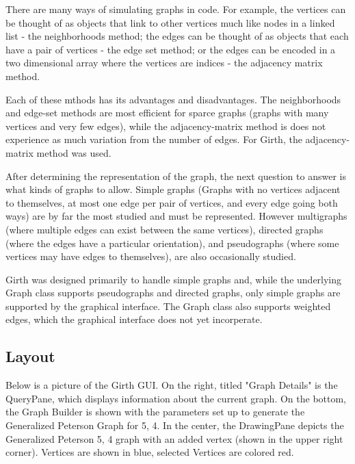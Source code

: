 \documentclass{article}
\begin{document}
There are many ways of simulating graphs in code.
For example,
the vertices can be thought of as objects that link to other vertices much like nodes in a linked list - the neighborhoods method;
the edges can be thought of as objects that each have a pair of vertices - the edge set method;
or the edges can be encoded in a two dimensional array where the vertices are indices - the adjacency matrix method.

Each of these mthods has its advantages and disadvantages.
The neighborhoods and edge-set methods are most efficient for sparce graphs (graphs with many vertices and very few edges),
while the adjacency-matrix method is does not experience as much variation from the number of edges.
For Girth, the adjacency-matrix method was used.

After determining the representation of the graph, the next question to answer is what kinds of graphs to allow.
Simple graphs (Graphs with no vertices adjacent to themselves, at most one edge per pair of vertices, and every edge going both ways)
are by far the most studied and must be represented.
However multigraphs (where multiple edges can exist between the same vertices),
directed graphs (where the edges have a particular orientation),
and pseudographs (where some vertices may have edges to themselves),
are also occasionally studied.

Girth was designed primarily to handle simple graphs and,
while the underlying Graph class supports pseudographs and directed graphs,
only simple graphs are supported by the graphical interface.
The Graph class also supports weighted edges, which the graphical interface does not yet incorperate. 

\subsection{Layout}

Below is a picture of the Girth GUI.
On the right, titled "Graph Details" is the QueryPane, which displays information about the current graph.
On the bottom, the Graph Builder is shown with the parameters set up to generate the Generalized Peterson Graph for 5, 4.
In the center, the DrawingPane depicts the Generalized Peterson 5, 4 graph with an added vertex
(shown in the upper right corner).
Vertices are shown in blue, selected Vertices are colored red.
\end{document}

